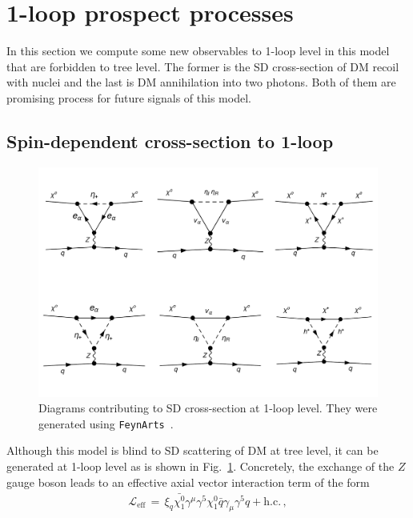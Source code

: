 \documentclass[12pt,letterpaper]{article}
\begin{document}
\section{1-loop prospect processes}
\label{sec:1-loop-processes}

In this section we compute some new observables to 1-loop level in this model that are forbidden to tree level. The former is the SD cross-section of DM recoil with nuclei and the last is DM annihilation into two photons. Both of them are promising process for future signals of this model.

\subsection{Spin-dependent cross-section to 1-loop}
\label{sec:sigma-SD}
%
\begin{figure}[h]
\begin{center}
\includegraphics[scale=0.45]{SD-diagrams}
\caption{ Diagrams contributing to SD cross-section at 1-loop level. They were generated using \texttt{FeynArts}~\cite{Hahn:2000kx}. }
\label{fig:SD}
\end{center}
\end{figure}
%
Although this model is blind to SD scattering of DM at tree level, it can be generated at 1-loop level as is shown in Fig.~\ref{fig:SD}. Concretely,  the exchange of the  $Z$ gauge boson leads to an effective axial vector interaction term of the form~\cite{Jungman:1995df, Ibarra:2016dlb}
%
\begin{align}
\label{eq:LSD-eff}
\mathcal{L}_{\text{eff}}\, =\, \xi_q \bar{\chi^0_1}\gamma^{\mu}\gamma^5 \chi^0_1 \bar{q}\gamma_{\mu}\gamma^5q + \text{h.c.}\,,
\end{align}
\end{document}
